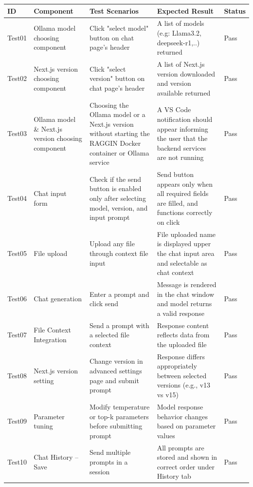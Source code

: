 \begin{table}[H]
	\centering
	\label{tab:rag_extension_test_scenarios}
	\begin{tabular}{p{1cm}p{3cm}p{4cm}p{4cm}p{1.5cm}}
		\hline
		\textbf{ID} & \textbf{Component} & \textbf{Test Scenarios} & \textbf{Expected Result} & \textbf{Status} \\ \hline
		Test01 & Ollama model choosing component & Click "select model" button on chat page's header & A list of models (e.g: Llama3.2, deepseek-r1,..) returned & Pass \\ \hline
		Test02 & Next.js version choosing component & Click "select version" button on chat page's header & A list of Next.js version downloaded and version available returned & Pass \\ \hline
		Test03 &  Ollama model \& Next.js version choosing component & Choosing the Ollama model or a Next.js version without starting the RAGGIN Docker container or Ollama service & A VS Code notification should appear informing the user that the backend services are not running & Pass \\ \hline
		Test04 & Chat input form & Check if the send button is enabled only after selecting model, version, and input prompt & Send button appears only when all required fields are filled, and functions correctly on click & Pass \\ \hline
		Test05 & File upload & Upload any file through context file input & File uploaded name is displayed upper the chat input area and selectable as chat context & Pass \\ \hline
		Test06 & Chat generation & Enter a prompt and click send & Message is rendered in the chat window and model returns a valid response & Pass \\ \hline
		Test07 & File Context Integration & Send a prompt with a selected file context & Response content reflects data from the uploaded file & Pass \\ \hline
		Test08 & Next.js version setting & Change version in advanced settings page and submit prompt & Response differs appropriately between selected versions (e.g., v13 vs v15) & Pass \\ \hline
		Test09 & Parameter tuning & Modify temperature or top-k parameters before submitting prompt & Model response behavior changes based on parameter values & Pass \\ \hline
		Test10 & Chat History – Save & Send multiple prompts in a session & All prompts are stored and shown in correct order under History tab & Pass \\ \hline

\end{tabular}
\end{table}
